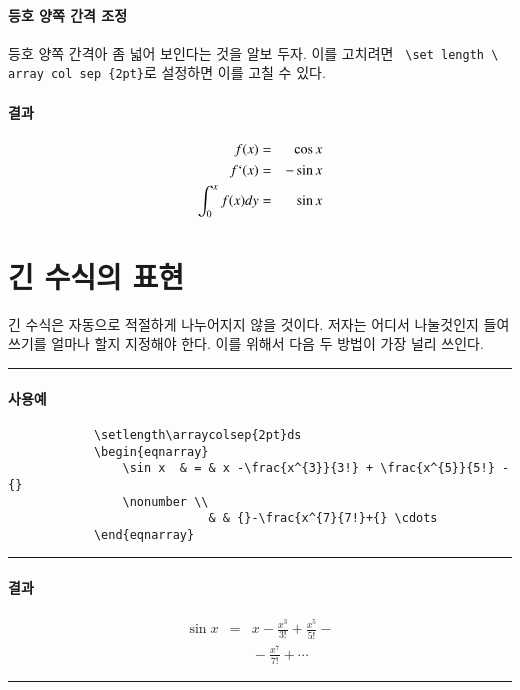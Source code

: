 		\paragraph{등호 양쪽 간격 조정}
		등호 양쪽 간격아 좀 넓어 보인다는 것을 알보 두자. 이를 고치려면 \verb| \set length \ array col sep {2pt}|로 설정하면 이를 고칠 수 있다.
		
	
		\paragraph{결과}
		\setlength\arraycolsep{2pt}
		\begin{eqnarray}
			f(x) & = & \cos x \\
			f`(x) & = & - \sin x \\
			\int_{0}^{x} f(x) dy & = & \sin x 
		\end{eqnarray}
		
%
%
%
\clearpage
\section{긴 수식의 표현}


	긴 수식은 자동으로 적절하게 나누어지지 않을 것이다. 
	저자는 어디서 나눌것인지 들여쓰기를 얼마나 할지 지정해야 한다. 
	이를 위해서 다음 두 방법이 가장 널리 쓰인다.
	\\
		\rule{\linewidth}{1pt}
		\paragraph{사용예}
		\begin{verbatim}
			\setlength\arraycolsep{2pt}ds
			\begin{eqnarray}
			    \sin x 	& = & x -\frac{x^{3}}{3!} + \frac{x^{5}}{5!} - {}
			    \nonumber \\
					    	& & {}-\frac{x^{7}{7!}+{} \cdots
			\end{eqnarray}
		\end{verbatim}
		\rule{\linewidth}{1pt}
		\paragraph{결과}
			\setlength\arraycolsep{2pt}
			\begin{eqnarray}
			    \sin x 	& = & x -\frac{x^{3}}{3!} + \frac{x^{5}}{5!} - {}
			    \nonumber \\
					 	& & {}-\frac{x^{7}}{7!}+{} \cdots
			\end{eqnarray}
		\rule{\linewidth}{1pt}
	
